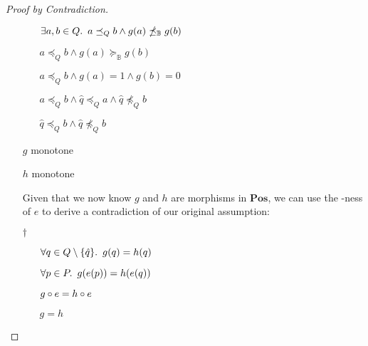 \begin{lemma}
\begin{proof}[Proof by Contradiction]
\begin{itemize}
\begin{itemize}
          \item[\imps]
            $\exists a, b\in Q\ldotp~a\preceq_Qb\wedge g(a)\npreceq_{\mathbb{B}}g(b)$

          \item[\imps]
            $a\preceq_Qb\wedge g(a)\succeq_{\mathbb{B}}g(b)$

          \item[\imps]
            $a\preceq_Qb\wedge g(a) = 1\wedge g(b) = 0$

          \item[\imps]
            $a\preceq_Qb\wedge \hat{q}\preceq_Qa\wedge \hat{q}\npreceq_Qb$
          \item[\imps]
            $\hat{q}\preceq_Qb\wedge \hat{q}\npreceq_Qb$
        \end{itemize}

      \item[\contras] $g$ monotone
        \marginnote{\Contra-$\star$}

      \item[\phs] $h$ monotone

      \addtolength{\itemsep}{.5\baselineskip}
      \item[\phs] Given that we now know $g$ and $h$ are morphisms in $\mathbf{Pos}$, we can use the \Epic-ness of $e$ to derive a contradiction of our original assumption:

      \item[$\dagger$]
        \begin{itemize}
          \item[\phantom{\imps}]
            $\forall q\in Q\setminus\{\hat{q}\}\ldotp~g(q) = h(q)$

          \item[\imps]
            $\forall p\in P\ldotp~g(e(p)) = h(e(q))$


          \item[\iffs]
            $g\circ e = h\circ e$
            \marginnote{\Def-$=$}

          \item[\imps]
            $g = h$
        \end{itemize}
      \addtolength{\itemsep}{-.5\baselineskip}


\end{itemize}
\end{proof}
\end{lemma}
